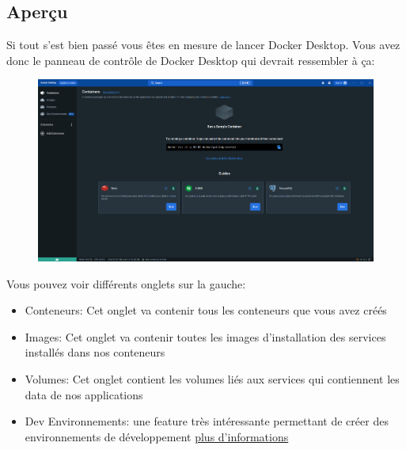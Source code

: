 \documentclass[internal]{nhitec_design}
\begin{document}
\newpage

    \subsection{Aperçu}

        Si tout s'est bien passé vous êtes en mesure de lancer Docker Desktop. 
        Vous avez donc le panneau de contrôle de Docker Desktop qui devrait ressembler à ça:\\
        
        \begin{figure}[h]
            \centering
            \includegraphics[scale=0.25]{Images_formation/PanelDocker.png}
        \end{figure}

        Vous pouvez voir différents onglets sur la gauche:

        \begin{itemize}
            \item[] Conteneurs: Cet onglet va contenir tous les conteneurs que vous avez créés\\
            \item[] Images: Cet onglet va contenir toutes les images d'installation des services installés dans nos conteneurs\\
            \item[] Volumes: Cet onglet contient les volumes liés aux services qui contiennent les data de nos applications\\
            \item[] Dev Environnements: une feature très intéressante permettant de créer des environnements de développement \footnotesize{\href{https://docs.docker.com/desktop/dev-environments/}{plus d'informations}}
        \end{itemize}
\end{document}
